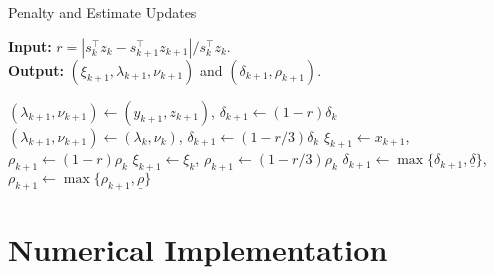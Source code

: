 \documentclass[letterpaper, 10 pt, conference]{ieeeconf}  \IEEEoverridecommandlockouts
\begin{document}
\vspace{-0.5cm}
\begin{algorithm}[htbp!]
\caption{Penalty and Estimate Updates}
\label{alg:PEU}
\small
\textbf{Input:} $r=\left|s_{k}^\top z_{k} - s_{k+1}^\top z_{k+1}\right|/s_{k}^\top z_{k}$.\\
\textbf{Output:} $(\xi_{k+1},\lambda_{k+1},\nu_{k+1})$ and $(\delta_{k+1},\rho_{k+1})$. 
\begin{algorithmic}[1]
\State 
$(\lambda_{k+1},\nu_{k+1})\leftarrow (y_{k+1},z_{k+1})$, $\delta_{k+1} \leftarrow (1-r) \delta_k$
\Else
\State $(\lambda_{k+1},\nu_{k+1})\leftarrow (\lambda_{k},\nu_{k})$, $\delta_{k+1} \leftarrow (1-r/3)\delta_k$
\EndIf
{}
\State  $\xi_{k+1}\leftarrow x_{k+1}$, $\rho_{k+1} \leftarrow (1-r) \rho_k$
\Else
\State $\xi_{k+1}\leftarrow \xi_k$, $\rho_{k+1} \leftarrow (1-r/3)\rho_k$
\EndIf
\State $\delta_{k+1} \leftarrow \max\{\delta_{k+1},\underline{\delta}\}$, $\rho_{k+1} \leftarrow \max\{\rho_{k+1},\underline{\rho}\}$%
\end{algorithmic}
\end{algorithm}
\vspace{-0.5cm}
\section{Numerical Implementation} \label{sec:imp}
\end{document}
